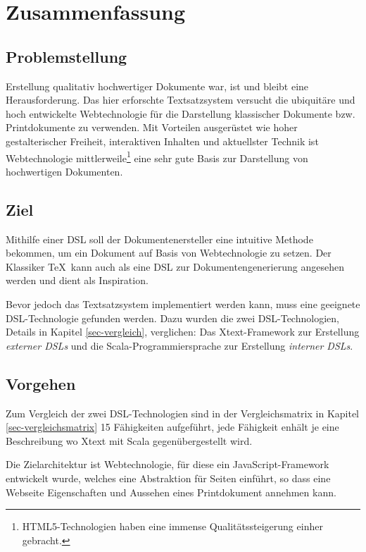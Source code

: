 \chapter{Zusammenfassung}


\section{Problemstellung}

Erstellung qualitativ hochwertiger Dokumente war,
ist und bleibt eine Herausforderung.
Das hier erforschte Textsatzsystem versucht die ubiquitäre und hoch entwickelte
Webtechnologie für die Darstellung klassischer Dokumente bzw. Printdokumente
zu verwenden.
Mit Vorteilen ausgerüstet wie hoher gestalterischer Freiheit,
interaktiven Inhalten und aktuellster Technik ist Webtechnologie
mittlerweile\footnote{
HTML5-Technologien haben eine immense Qualitätssteigerung einher gebracht.}
eine sehr gute Basis zur Darstellung von hochwertigen Dokumenten.


\section{Ziel}

Mithilfe einer DSL soll der Dokumentenersteller eine intuitive Methode
bekommen, um ein Dokument auf Basis von Webtechnologie zu setzen.
Der Klassiker \TeX~kann auch als eine DSL zur Dokumentengenerierung
angesehen werden und dient als Inspiration.

Bevor jedoch das Textsatzsystem implementiert werden kann, muss eine
geeignete DSL-Technologie gefunden werden.
Dazu wurden die zwei DSL-Technologien, Details in Kapitel \ref{sec-vergleich},
verglichen:
Das Xtext-Framework zur Erstellung \emph{externer DSLs} und
die Scala-Programmiersprache zur Erstellung \emph{interner DSLs}.


\section{Vorgehen}

Zum Vergleich der zwei DSL-Technologien sind
in der Vergleichsmatrix in Kapitel \ref{sec-vergleichsmatrix}
15 Fähigkeiten aufgeführt, jede Fähigkeit enhält je eine Beschreibung
wo Xtext mit Scala gegenübergestellt wird.

Die Zielarchitektur ist Webtechnologie, für diese ein JavaScript-Framework
entwickelt wurde, welches eine Abstraktion für Seiten einführt, so dass eine
Webseite Eigenschaften und Aussehen eines Printdokument annehmen kann.

